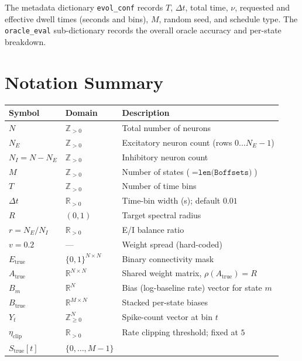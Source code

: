 \documentclass[11pt]{article}
\begin{document}
The metadata dictionary \texttt{evol\_conf} records $T$, $\Delta t$,
total time, $\nu$, requested and effective dwell times (seconds and bins),
$M$, random seed, and schedule type.
The \texttt{oracle\_eval} sub-dictionary records the overall oracle
accuracy and per-state breakdown.

\section{Notation Summary}
\label{sec:notation}

\begin{table}[htbp]
\centering
\renewcommand{\arraystretch}{1.2}
\begin{tabular}{lll}
\toprule
Symbol & Domain & Description \\
\midrule
$N$ & $\mathbb{Z}_{>0}$ & Total number of neurons \\
$N_E$ & $\mathbb{Z}_{>0}$ & Excitatory neuron count (rows $0\dots N_E-1$) \\
$N_I = N-N_E$ & $\mathbb{Z}_{>0}$ & Inhibitory neuron count \\
$M$ & $\mathbb{Z}_{>0}$ &
  Number of states ($= \texttt{len(Boffsets)}$) \\
$T$ & $\mathbb{Z}_{>0}$ & Number of time bins \\
$\Delta t$ & $\mathbb{R}_{>0}$ & Time-bin width (s); default $0.01$ \\
$R$ & $(0,1)$ & Target spectral radius \\
$r = N_E/N_I$ & $\mathbb{R}_{>0}$ & E/I balance ratio \\
$v = 0.2$ & --- & Weight spread (hard-coded) \\
$E_{\text{true}}$ & $\{0,1\}^{N\times N}$ & Binary connectivity mask \\
$A_{\text{true}}$ & $\mathbb{R}^{N\times N}$ &
  Shared weight matrix, $\rho(A_{\text{true}}) = R$ \\
$B_m$ & $\mathbb{R}^N$ & Bias (log-baseline rate) vector for state $m$ \\
$B_{\text{true}}$ & $\mathbb{R}^{M\times N}$ & Stacked per-state biases \\
$Y_t$ & $\mathbb{Z}_{\geq 0}^N$ & Spike-count vector at bin $t$ \\
$\eta_{\mathrm{clip}}$ & $\mathbb{R}_{>0}$ &
  Rate clipping threshold; fixed at $5$ \\
\midrule
$S_{\text{true}}[t]$ & $\{0,\dots,M-1\}$ &

\end{tabular}
\end{table}
\end{document}
